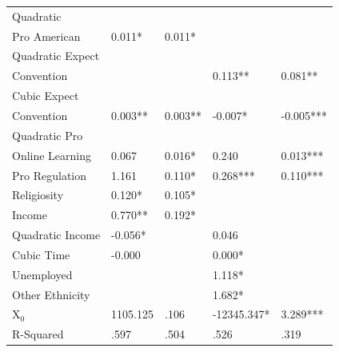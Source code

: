 \documentclass[AER]{./aea-latex-templates/AEA}
\begin{document}
\begin{table}
\begin{tabular}{lllll}
            Quadratic
            \\Pro American & 0.011* & 0.011* \\ %
            Quadratic Expect
            \\Convention &  &  & 0.113** & 0.081** \\ %
            Cubic Expect
            \\Convention & 0.003** & 0.003** & -0.007* & -0.005*** \\ %
            Quadratic Pro
            \\Online Learning & 0.067 & 0.016* & 0.240 & 0.013*** \\ %
            Pro Regulation & 1.161 & 0.110* & 0.268*** & 0.110*** \\ %
            Religiosity & 0.120* & 0.105* \\ %
            Income & 0.770** & 0.192* \\ %
            Quadratic Income & -0.056* &  & 0.046 &  \\ %
            Cubic Time & -0.000 &  & 0.000* &  \\ %
            Unemployed &  &  & 1.118* &  \\ %
            Other Ethnicity &  &  & 1.682* & \\ %
            X$_0$ & 1105.125 & .106 & -12345.347* & 3.289*** \\
            \bottomrule
            R-Squared & .597 & .504 & .526 & .319 %
        

\end{tabular}
\end{table}
\end{document}
